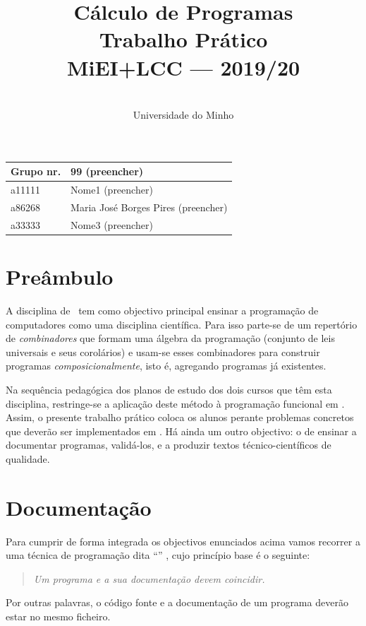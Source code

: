 \documentclass[a4paper]{article}
\title{
       	    Cálculo de Programas
\\
       	Trabalho Prático
\\
       	MiEI+LCC --- 2019/20
}
\author{
       	\dium
\\
       	Universidade do Minho
}
\date\mydate
\begin{document}
\maketitle

\begin{center}\large
\begin{tabular}{ll}
\textbf{Grupo} nr. & 99 (preencher)
\\\hline
a11111 & Nome1 (preencher)	
\\
a86268 & Maria José Borges Pires (preencher)	
\\
a33333 & Nome3 (preencher)	
\end{tabular}
\end{center}

\section{Preâmbulo}

A disciplina de \CP\ tem como objectivo principal ensinar
a progra\-mação de computadores como uma disciplina científica. Para isso
parte-se de um repertório de \emph{combinadores} que formam uma álgebra da
programação (conjunto de leis universais e seus corolários) e usam-se esses
combinadores para construir programas \emph{composicionalmente}, isto é,
agregando programas já existentes.
  
Na sequência pedagógica dos planos de estudo dos dois cursos que têm
esta disciplina, restringe-se a aplicação deste método à programação
funcional em \Haskell. Assim, o presente trabalho prático coloca os
alunos perante problemas concretos que deverão ser implementados em
\Haskell.  Há ainda um outro objectivo: o de ensinar a documentar
programas, validá-los, e a produzir textos técnico-científicos de
qualidade.

\section{Documentação} Para cumprir de forma integrada os objectivos
enunciados acima vamos recorrer a uma técnica de programa\-ção dita
``'' \cite{Kn92}, cujo princípio base é o seguinte:
\begin{quote}\em Um programa e a sua documentação devem coincidir.
\end{quote} Por outras palavras, o código fonte e a documentação de um
programa deverão estar no mesmo ficheiro.
\end{document}
